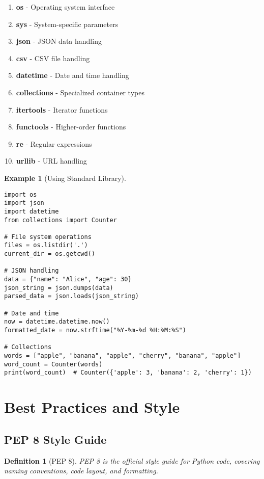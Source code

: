 \documentclass[11pt]{article}
\newtheorem{definition}{Definition}[section]
\newtheorem{example}{Example}[section]
\begin{document}
\begin{enumerate}
    \item \textbf{os} - Operating system interface
    \item \textbf{sys} - System-specific parameters
    \item \textbf{json} - JSON data handling
    \item \textbf{csv} - CSV file handling
    \item \textbf{datetime} - Date and time handling
    \item \textbf{collections} - Specialized container types
    \item \textbf{itertools} - Iterator functions
    \item \textbf{functools} - Higher-order functions
    \item \textbf{re} - Regular expressions
    \item \textbf{urllib} - URL handling
\end{enumerate}

\begin{example}[Using Standard Library]
\begin{lstlisting}
import os
import json
import datetime
from collections import Counter

# File system operations
files = os.listdir('.')
current_dir = os.getcwd()

# JSON handling
data = {"name": "Alice", "age": 30}
json_string = json.dumps(data)
parsed_data = json.loads(json_string)

# Date and time
now = datetime.datetime.now()
formatted_date = now.strftime("%Y-%m-%d %H:%M:%S")

# Collections
words = ["apple", "banana", "apple", "cherry", "banana", "apple"]
word_count = Counter(words)
print(word_count)  # Counter({'apple': 3, 'banana': 2, 'cherry': 1})
\end{lstlisting}
\end{example}

\section{Best Practices and Style}

\subsection{PEP 8 Style Guide}

\begin{definition}[PEP 8]
PEP 8 is the official style guide for Python code, covering naming conventions, code layout, and formatting.
\end{definition}
\end{document}

